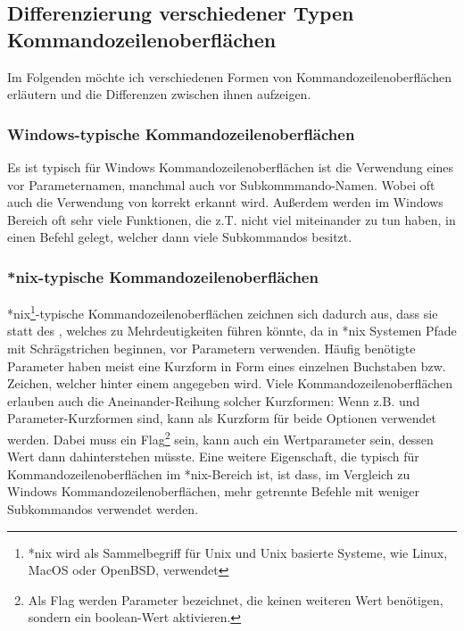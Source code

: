   \subsection{Differenzierung verschiedener Typen Kommandozeilenoberflächen}\label{subsec:DifferentCLITypes}
  Im Folgenden möchte ich verschiedenen Formen von Kommandozeilenoberflächen erläutern und die Differenzen zwischen ihnen aufzeigen.
  \subsubsection{Windows-typische Kommandozeilenoberflächen}
  Es ist typisch für Windows Kommandozeilenoberflächen ist die Verwendung eines \inlinecode{/} vor Parameternamen, manchmal auch vor Subkommmando-Namen.
  Wobei oft auch die Verwendung von \inlinecode{-} korrekt erkannt wird.
  Au\ss erdem werden im Windows Bereich oft sehr viele Funktionen, die z.T. nicht viel miteinander zu tun haben, in einen Befehl gelegt, welcher dann viele Subkommandos besitzt.
  \subsubsection{*nix-typische Kommandozeilenoberflächen}
  *nix\footnote{*nix wird als Sammelbegriff für Unix und Unix basierte Systeme, wie Linux, MacOS oder OpenBSD, verwendet}-typische Kommandozeilenoberflächen
  zeichnen sich dadurch aus, dass sie statt des \inlinecode{/}, welches zu Mehrdeutigkeiten führen könnte, da in *nix Systemen Pfade mit Schrägstrichen beginnen, vor Parametern \inlinecode{--} verwenden.
  Häufig benötigte Parameter haben meist eine Kurzform in Form eines einzelnen Buchstaben bzw. Zeichen, welcher hinter einem \inlinecode{-} angegeben wird.
  Viele Kommandozeilenoberflächen erlauben auch die Aneinander-Reihung solcher Kurzformen:
  Wenn z.B.  und  Parameter-Kurzformen sind, kann  als Kurzform für beide Optionen verwendet werden.
  Dabei muss  ein Flag\footnote{Als Flag werden Parameter bezeichnet, die keinen weiteren Wert benötigen, sondern ein boolean-Wert aktivieren.} sein,
   kann auch ein Wertparameter sein, dessen Wert dann dahinterstehen müsste.
  Eine weitere Eigenschaft, die typisch für Kommandozeilenoberflächen im *nix-Bereich ist, ist dass,
  im Vergleich zu Windows Kommandozeilenoberflächen, mehr getrennte Befehle mit weniger Subkommandos verwendet werden.
